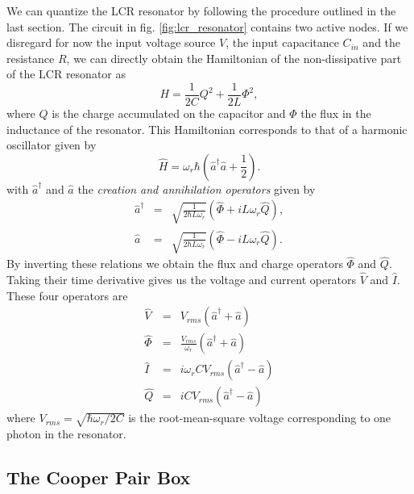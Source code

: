 We can quantize the LCR resonator by following the procedure outlined in the last section. The circuit in fig. \ref{fig:lcr_resonator} contains two active nodes. If we disregard for now the input voltage source $V$, the input capacitance $C_{in}$ and the resistance $R$, we can directly obtain the Hamiltonian of the non-dissipative part of the LCR resonator as
%
\begin{equation}
H = \frac{1}{2C}Q^2+\frac{1}{2L}\Phi^2,
\end{equation}
%
where $Q$ is the charge accumulated on the capacitor and $\Phi$ the flux in the inductance of the resonator. This Hamiltonian corresponds to that of a harmonic oscillator given by
%
\begin{equation}
\hat{H} = \omega_r\hbar\left(\hat{a}^\dagger\hat{a}+\frac{1}{2}\right). \label{eq:lc_hamiltonian}
\end{equation}
%
with $\hat{a}^\dagger$ and $\hat{a}$ the {\it creation and annihilation operators} given by
%
\begin{eqnarray}
\hat{a}^\dagger & = & \sqrt{\frac{1}{2\hbar L \omega_r}}\left(\hat{\Phi}+iL\omega_r \hat{Q}\right),\\
\hat{a} & = & \sqrt{\frac{1}{2\hbar L\omega_r}}\left( \hat{\Phi}-iL\omega_r \hat{Q}\right).
\end{eqnarray}
%
By inverting these relations we obtain the flux and charge operators $\hat{\Phi}$ and $\hat{Q}$. Taking their time derivative gives us the voltage and current operators $\hat{V}$ and $\hat{I}$. These four operators are
%
\begin{eqnarray}
\hat{V} & = & V_{rms}\left(\hat{a}^\dagger+\hat{a}\right) \\
\hat{\Phi} & = & \frac{V_{rms}}{\omega_r}\left(\hat{a}^\dagger+\hat{a}\right) \\
\hat{I} & = & i \omega_r C V_{rms}\left(\hat{a}^\dagger-\hat{a}\right) \\
\hat{Q} & = & i C V_{rms}\left(\hat{a}^\dagger-\hat{a}\right)
\end{eqnarray}
%
where $V_{rms} = \sqrt{\hbar\omega_r/2C}$ is the root-mean-square voltage corresponding to one photon in the resonator.

\subsection{The Cooper Pair Box}

